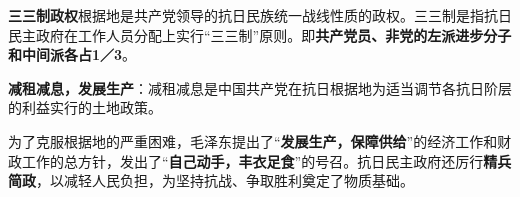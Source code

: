 \textbf{三三制政权}根据地是共产党领导的抗日民族统一战线性质的政权。三三制是指抗日民主政府在工作人员分配上实行``三三制''原则。即\textbf{共产党员、非党的左派进步分子和中间派各占1／3}。
{}

\textbf{减租减息，发展生产}：减租减息是中国共产党在抗日根据地为适当调节各抗日阶层的利益实行的土地政策。

{为了克服根据地的严重困难，毛泽东提出了``}\textbf{发展生产，保障供给}{''的经济工作和财政工作的总方针，发出了``}\textbf{自己动手，丰衣足食}{''的号召。抗日民主政府还厉行}\textbf{精兵简政}{，以减轻人民负担，为坚持抗战、争取胜利奠定了物质基础。}
